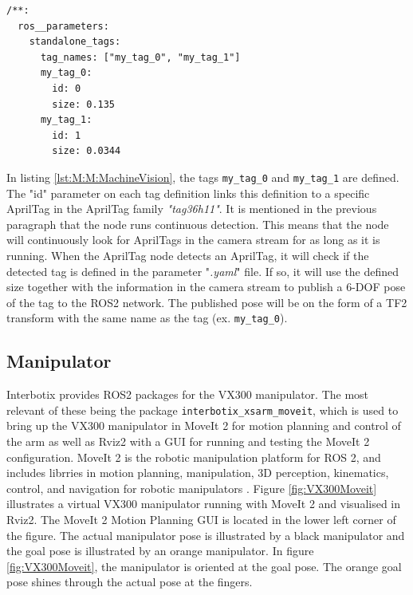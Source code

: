 \begin{lstlisting}[language=XML, label=lst:M:M:MachineVision, caption={Example of AprilTag tag definitions in a ".yaml" file. This example defines two tags of different names, using the tag id 0 and 1 in the defined tag family The size is alse defined for each tag. The tag family (tag36h11) is set in another parameter file.}]
/**:
  ros__parameters:
    standalone_tags:
      tag_names: ["my_tag_0", "my_tag_1"]
      my_tag_0:
        id: 0
        size: 0.135
      my_tag_1:
        id: 1
        size: 0.0344
\end{lstlisting}

In listing \ref{lst:M:M:MachineVision}, the tags \lstinline{my_tag_0} and \lstinline{my_tag_1} are defined. The "id" parameter on each tag definition links this definition to a specific AprilTag in the AprilTag family \textit{"tag36h11"}. It is mentioned in the previous paragraph that the node runs continuous detection. This means that the node will continuously look for AprilTags in the camera stream for as long as it is running. When the AprilTag node detects an AprilTag, it will check if the detected tag is defined in the parameter "\textit{.yaml}" file. If so, it will use the defined size together with the information in the camera stream to publish a 6-DOF pose of the tag to the ROS2 network. The published pose will be on the form of a TF2 transform with the same name as the tag (ex. \lstinline{my_tag_0}).

\FloatBarrier
\subsection{Manipulator}\label{sec:M:MRC:Manipulator}
Interbotix provides ROS2 packages for the VX300 manipulator. The most relevant of these being the package \lstinline{interbotix_xsarm_moveit}, which is used to bring up the VX300 manipulator in MoveIt 2 for motion planning and control of the arm as well as Rviz2 with a GUI for running and testing the MoveIt 2 configuration. MoveIt 2 is the robotic manipulation platform for ROS 2, and includes librries in motion planning, manipulation, 3D perception, kinematics, control, and navigation for robotic manipulators \cite{moveit2_doc}. Figure \ref{fig:VX300Moveit} illustrates a virtual VX300 manipulator running with MoveIt 2 and visualised in Rviz2. The MoveIt 2 Motion Planning GUI is located in the lower left corner of the figure. The actual manipulator pose is illustrated by a black manipulator and the goal pose is illustrated by an orange manipulator. In figure \ref{fig:VX300Moveit}, the manipulator is oriented at the goal pose. The orange goal pose shines through the actual pose at the fingers.

